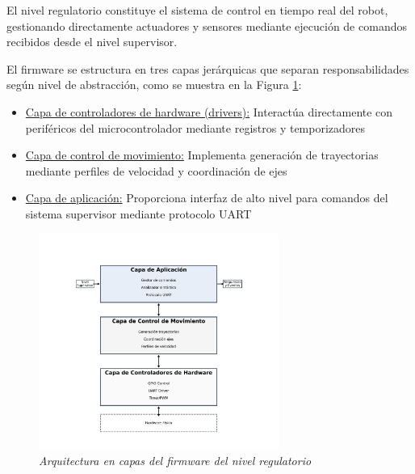 El nivel regulatorio constituye el sistema de control en tiempo real del robot, gestionando directamente actuadores y sensores mediante ejecución de comandos recibidos desde el nivel supervisor.

El firmware se estructura en tres capas jerárquicas que separan responsabilidades según nivel de abstracción, como se muestra en la Figura \ref{fig:arquitectura_regulatorio}:

\begin{itemize}[label=$\bullet$]
\item \underline{Capa de controladores de hardware (drivers):} Interactúa directamente con periféricos del microcontrolador mediante registros y temporizadores
\item \underline{Capa de control de movimiento:} Implementa generación de trayectorias mediante perfiles de velocidad y coordinación de ejes
\item \underline{Capa de aplicación:} Proporciona interfaz de alto nivel para comandos del sistema supervisor mediante protocolo UART
\end{itemize}

\begin{figure}[H]
    \centering
    \includegraphics[width=0.7\textwidth]{imagenes/arquitectura_regulatorio_capas.png}
    \caption{\textit{Arquitectura en capas del firmware del nivel regulatorio}}
    \label{fig:arquitectura_regulatorio}
\end{figure}
